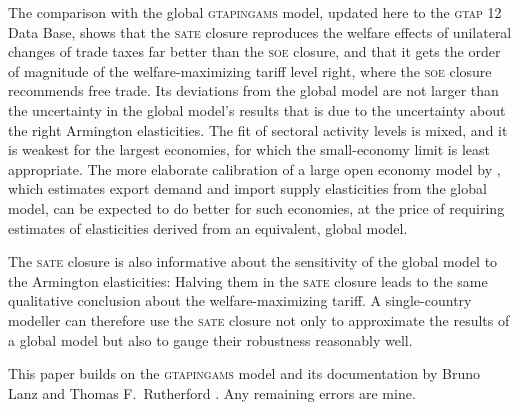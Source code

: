 \documentclass{jgea}
\newcommand{\SOE}{\textsc{soe}\xspace}
\newcommand{\SATE}{\textsc{sate}\xspace}
\newcommand{\GTAP}{\textsc{gtap}\xspace}
\newcommand{\GTAPINGAMS}{\textsc{gtapingams}\xspace}
\begin{document}
The comparison with the global \GTAPINGAMS model, updated here to the \GTAP 12 Data Base, shows that the \SATE closure reproduces the welfare effects of unilateral changes of trade taxes far better than the \SOE closure, and that it gets the order of magnitude of the welfare-maximizing tariff level right, where the \SOE closure recommends free trade.
Its deviations from the global model are not larger than the uncertainty in the global model's results that is due to the uncertainty about the right Armington elasticities.
The fit of sectoral activity levels is mixed, and it is weakest for the largest economies, for which the small-economy limit is least appropriate.
The more elaborate calibration of a large open economy model by \citet{Schreiber2024}, which estimates export demand and import supply elasticities from the global model, can be expected to do better for such economies, at the price of requiring estimates of elasticities derived from an equivalent, global model.

The \SATE closure is also informative about the sensitivity of the global model to the Armington elasticities:
Halving them in the \SATE closure leads to the same qualitative conclusion about the welfare-maximizing tariff.
A single-country modeller can therefore use the \SATE closure not only to approximate the results of a global model but also to gauge their robustness reasonably well.


\begin{acknowledgements}

This paper builds on the \GTAPINGAMS model and its documentation by Bruno Lanz and Thomas F.\ Rutherford \citep{LanzRutherford2016}.
Any remaining errors are mine.

\end{acknowledgements}
\end{document}

